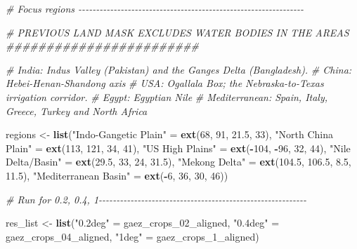 \documentclass[
  11pt,
]{article}
\newenvironment{Shaded}{\begin{snugshade}}{\end{snugshade}}
\newcommand{\CommentTok}[1]{\textcolor[rgb]{0.56,0.35,0.01}{\textit{#1}}}
\newcommand{\DecValTok}[1]{\textcolor[rgb]{0.00,0.00,0.81}{#1}}
\newcommand{\FloatTok}[1]{\textcolor[rgb]{0.00,0.00,0.81}{#1}}
\newcommand{\FunctionTok}[1]{\textcolor[rgb]{0.13,0.29,0.53}{\textbf{#1}}}
\newcommand{\NormalTok}[1]{#1}
\newcommand{\OtherTok}[1]{\textcolor[rgb]{0.56,0.35,0.01}{#1}}
\newcommand{\SpecialCharTok}[1]{\textcolor[rgb]{0.81,0.36,0.00}{\textbf{#1}}}
\newcommand{\StringTok}[1]{\textcolor[rgb]{0.31,0.60,0.02}{#1}}
\begin{document}
\begin{Shaded}
\begin{Highlighting}[]
\CommentTok{\# Focus regions {-}{-}{-}{-}{-}{-}{-}{-}{-}{-}{-}{-}{-}{-}{-}{-}{-}{-}{-}{-}{-}{-}{-}{-}{-}{-}{-}{-}{-}{-}{-}{-}{-}{-}{-}{-}{-}{-}{-}{-}{-}{-}{-}{-}{-}{-}{-}{-}{-}{-}{-}{-}{-}{-}{-}{-}{-}{-}{-}{-}{-}{-}{-}{-}}

\CommentTok{\# PREVIOUS LAND MASK EXCLUDES WATER BODIES IN THE AREAS \#\#\#\#\#\#\#\#\#\#\#\#\#\#\#\#\#\#\#\#\#\#\#\#}

\CommentTok{\# India: Indus Valley (Pakistan) and the Ganges Delta (Bangladesh).}
\CommentTok{\# China: Hebei{-}Henan{-}Shandong axis}
\CommentTok{\# USA: Ogallala Box; the Nebraska{-}to{-}Texas irrigation corridor.}
\CommentTok{\# Egypt: Egyptian Nile}
\CommentTok{\# Mediterranean: Spain, Italy, Greece, Turkey and North Africa}

\NormalTok{regions }\OtherTok{\textless{}{-}} \FunctionTok{list}\NormalTok{(}\StringTok{"Indo{-}Gangetic Plain"} \OtherTok{=} \FunctionTok{ext}\NormalTok{(}\DecValTok{68}\NormalTok{, }\DecValTok{91}\NormalTok{, }\FloatTok{21.5}\NormalTok{, }\DecValTok{33}\NormalTok{),}
                \StringTok{"North China Plain"} \OtherTok{=} \FunctionTok{ext}\NormalTok{(}\DecValTok{113}\NormalTok{, }\DecValTok{121}\NormalTok{, }\DecValTok{34}\NormalTok{, }\DecValTok{41}\NormalTok{),}
                \StringTok{"US High Plains"} \OtherTok{=} \FunctionTok{ext}\NormalTok{(}\SpecialCharTok{{-}}\DecValTok{104}\NormalTok{, }\SpecialCharTok{{-}}\DecValTok{96}\NormalTok{, }\DecValTok{32}\NormalTok{, }\DecValTok{44}\NormalTok{),}
                \StringTok{"Nile Delta/Basin"} \OtherTok{=} \FunctionTok{ext}\NormalTok{(}\FloatTok{29.5}\NormalTok{, }\DecValTok{33}\NormalTok{, }\DecValTok{24}\NormalTok{, }\FloatTok{31.5}\NormalTok{),}
                \StringTok{"Mekong Delta"} \OtherTok{=} \FunctionTok{ext}\NormalTok{(}\FloatTok{104.5}\NormalTok{, }\FloatTok{106.5}\NormalTok{, }\FloatTok{8.5}\NormalTok{, }\FloatTok{11.5}\NormalTok{),}
                \StringTok{"Mediterranean Basin"} \OtherTok{=} \FunctionTok{ext}\NormalTok{(}\SpecialCharTok{{-}}\DecValTok{6}\NormalTok{, }\DecValTok{36}\NormalTok{, }\DecValTok{30}\NormalTok{, }\DecValTok{46}\NormalTok{))}

\CommentTok{\# Run for 0.2, 0.4, 1{-}{-}{-}{-}{-}{-}{-}{-}{-}{-}{-}{-}{-}{-}{-}{-}{-}{-}{-}{-}{-}{-}{-}{-}{-}{-}{-}{-}{-}{-}{-}{-}{-}{-}{-}{-}{-}{-}{-}{-}{-}{-}{-}{-}{-}{-}{-}{-}{-}{-}{-}{-}{-}{-}{-}{-}{-}{-}{-}}

\NormalTok{res\_list }\OtherTok{\textless{}{-}} \FunctionTok{list}\NormalTok{(}\StringTok{"0.2deg"} \OtherTok{=}\NormalTok{ gaez\_crops\_02\_aligned,}
                 \StringTok{"0.4deg"} \OtherTok{=}\NormalTok{ gaez\_crops\_04\_aligned,}
                 \StringTok{"1deg"}   \OtherTok{=}\NormalTok{ gaez\_crops\_1\_aligned)}


\end{Highlighting}
\end{Shaded}
\end{document}
